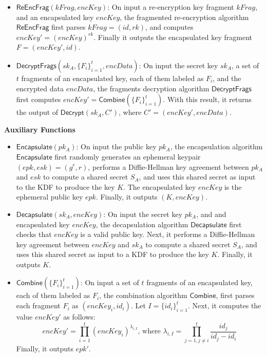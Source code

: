 \documentclass[12pt]{article}
\begin{document}
\begin{itemize}
	\item $\mathsf{ReEncFrag}(kFrag, encKey)$: On input a re-encryption key fragment $kFrag$, and an encapsulated key $encKey$, the fragmented re-encryption algorithm $\mathsf{ReEncFrag}$ first parses $kFrag = (id, rk)$, 
	and computes $encKey' = (encKey)^{rk}$. Finally it outputs the encapsulated key fragment $F = (encKey', id)$. 
		
		\item $\mathsf{DecryptFrags}(sk_A, \{F_i\}_{i=1}^t, encData)$: On input the secret key $sk_A$, a set of $t$ fragments of an encapsulated key, each of them labeled as $F_i$, and the encrypted data $encData$, the fragments decryption algorithm $\mathsf{DecryptFrags}$ first computes $encKey' = \mathsf{Combine}(\{F_i\}_{i=1}^t)$. With this result, it returns the output of $\mathsf{Decrypt}(sk_A, C')$, where $C' = (encKey', encData)$.
\end{itemize}
	


\textbf{Auxiliary Functions}
\begin{itemize}
	\item $\mathsf{Encapsulate}(pk_A)$: On input the public key $pk_A$, %
	the encapsulation algorithm $\mathsf{Encapsulate}$ first randomly generates an ephemeral keypair $(epk, esk) = (g^r, r)$, performs a Diffie-Hellman key agreement between $pk_A$ and $esk$ to compute a shared secret $S_A$, and uses this shared secret as input to the KDF to produce the key $K$. The encapsulated key $encKey$ is the ephemeral public key $epk$. Finally, it outputs $(K, encKey)$.
	\item $\mathsf{Decapsulate}(sk_A, encKey)$: On input the secret key $pk_A$, and and encapsulated key $encKey$, the decapsulation algorithm $\mathsf{Decapsulate}$ first checks that $encKey$ is a valid public key. 
	Next, it performs a Diffie-Hellman key agreement between $encKey$ and $sk_A$ to compute a shared secret $S_A$, and uses this shared secret as input to a KDF to produce the key $K$. Finally, it outputs $K$.
	\item $\mathsf{Combine}(\{F_i\}_{i=1}^t)$: On input a set of $t$ fragments of an encapsulated key, each of them labeled as $F_i$, the combination algorithm $\mathsf{Combine}$, first parses each fragment $F_i$ as $(encKey_i, id_i)$. %
Let $I = \{id_i\}_{i=1}^t$. Next, it computes the value $encKey'$ as follows:
$$encKey' = \prod\limits_{i=1}^{t} (encKey_i)^{\lambda_{i, I}}
\text{, where } \lambda_{i, I} = \prod\limits_{j=1, j\neq i}^{t} \frac{id_j}{id_j-id_i}$$
Finally, it outputs $epk'$.
\end{itemize}
\end{document}
